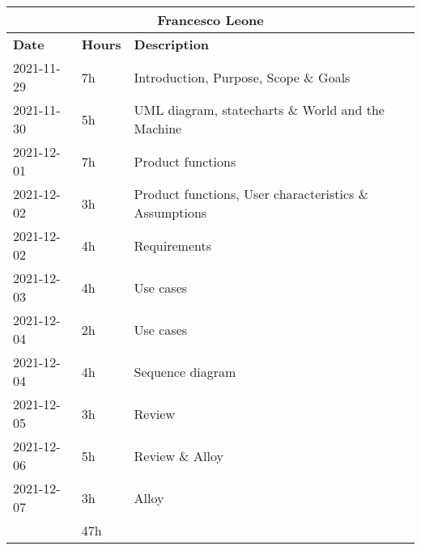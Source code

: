 \begin{table}[H]
    \centering
    \begin{tabular}{|l|l|l|}
        \multicolumn{3}{c}{\textbf{Francesco Leone}}                      \\
        \hline
        \textbf{Date} & \textbf{Hours} & \textbf{Description}              \\\hline
        2021-11-29    & 7h             & Introduction, Purpose, Scope \& Goals                  \\\hline
        2021-11-30    & 5h             & UML diagram, statecharts \& World and the Machine      \\\hline
        2021-12-01    & 7h             & Product functions                                      \\\hline
        2021-12-02    & 3h             & Product functions, User characteristics \& Assumptions \\\hline
        2021-12-02    & 4h             & Requirements                                           \\\hline
        2021-12-03    & 4h             & Use cases                                              \\\hline
        2021-12-04    & 2h             & Use cases                                              \\\hline
        2021-12-04    & 4h             & Sequence diagram                                       \\\hline
        2021-12-05    & 3h             & Review                                                 \\\hline
        2021-12-06    & 5h             & Review \& Alloy                                        \\\hline
        2021-12-07    & 3h             & Alloy                                                  \\\hline\hline
                      & 47h            &                                                        \\\hline
    \end{tabular}
\end{table}